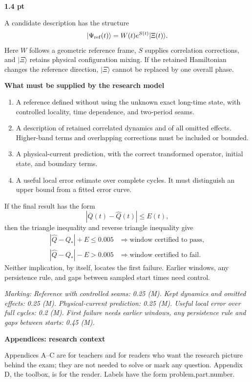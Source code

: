 \documentclass[11pt,a4paper]{article}
\newcommand{\ket}[1]{\lvert #1\rangle}
\newcommand{\Qbar}{\overline Q}
\newcommand{\soltitle}[3]{\par\Needspace{4\baselineskip}{\bfseries\color{ink}#1\quad #3}\hfill{\small\bfseries #2 pt}\par}
\newcommand{\marking}[1]{\par{\footnotesize\textit{Marking: #1}}\par}
\newcommand{\smallheading}[1]{\par\Needspace{6\baselineskip}\medskip\textbf{#1}\par}
\newcounter{problemno}
\newcounter{figc}
\newcommand{\pagecode}{G}
\newcommand{\appendixstart}{\clearpage\renewcommand{\pagecode}{SA}\setcounter{page}{1}\setcounter{problemno}{0}\setcounter{figc}{0}}
\begin{document}
\soltitle{C.2}{1.4}{The missing inputs are the research}
A candidate description has the structure
\[
\ket{\Psi_{\rm ref}(t)}=W(t)e^{S(t)}\ket{\Xi(t)}.
\]
Here $W$ follows a geometric reference frame, $S$ supplies correlation corrections, and $\ket\Xi$ retains physical configuration mixing. If the retained Hamiltonian changes the reference direction, $\ket\Xi$ cannot be replaced by one overall phase.

\smallheading{What must be supplied by the research model}
\begin{enumerate}[leftmargin=7mm,itemsep=5pt]
\item A reference defined without using the unknown exact long-time state, with controlled locality, time dependence, and two-period seams.
\item A description of retained correlated dynamics and of all omitted effects. Higher-band terms and overlapping corrections must be included or bounded.
\item A physical-current prediction, with the correct transformed operator, initial state, and boundary terms.
\item A useful local error estimate over complete cycles. It must distinguish an upper bound from a fitted error curve.
\end{enumerate}

If the final result has the form
\[
|\Qbar(t)-\widehat Q(t)|\leq E(t),
\]
then the triangle inequality and reverse triangle inequality give
\[
\begin{array}{ll}
|\widehat Q-Q_*|+E\leq0.005
&\Longrightarrow\text{window certified to pass},\\[3pt]
|\widehat Q-Q_*|-E>0.005
&\Longrightarrow\text{window certified to fail}.
\end{array}
\]
Neither implication, by itself, locates the first failure. Earlier windows, any persistence rule, and gaps between sampled start times need control.

\marking{Reference with controlled seams: 0.25 (M). Kept dynamics and omitted effects: 0.25 (M). Physical-current prediction: 0.25 (M). Useful local error over full cycles: 0.2 (M). First failure needs earlier windows, any persistence rule and gaps between starts: 0.45 (M).}



\appendixstart
{\LARGE\bfseries\color{ink}Appendices: research context}\par\medskip
Appendices A--C are for teachers and for readers who want the research picture behind the exam; they are not needed to solve or mark any question. Appendix D, the toolbox, is for the reader. Labels have the form problem.part.number.
\end{document}
